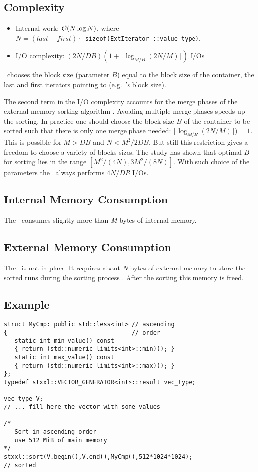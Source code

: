 \documentclass[twoside]{book}
\begin{document}
\subsection*{Complexity}
\label{sortcomplexity}
\begin{itemize}
\item Internal work: $\mathcal{O}\!\left( N \log N\right)$, where \\$N = (last -
first)\cdot$~\texttt{sizeof(ExtIterator\_::value\_type)}.
\item I/O complexity: $(2N/DB)(1 + \lceil {\log}_{M/B}(2N/M) \rceil)$ I/Os
\end{itemize}

\xsort\ chooses the block size (parameter $B$) equal to the block size
of the container, the last and first iterators pointing to
(e.g.\ \xvector's block size).

The second term in the I/O complexity accounts for the merge phases of
the external memory sorting algorithm \cite{DemSan03}. Avoiding
multiple merge phases  
speeds up the sorting. In practice one should choose the block size
$B$ of the container to be 
sorted such that there is only one merge phase needed: $\lceil
{\log}_{M/B}(2N/M) \rceil) = 1$. This is 
possible for $M > DB$ and $N < M^2/2DB$. But still this restriction
gives a freedom to choose a variety of blocks sizes. The study
\cite{DemSan03} has shown that optimal $B$ for sorting lies in the
range $[M^2/(4N),3M^2/(8N)]$. With such choice of the parameters the
\xsort\ always performs $4N/DB$ I/Os.

\subsection*{Internal Memory Consumption}
\label{sortimem}
The \xsort\ consumes slightly more than \emph{M} bytes of internal
memory. 

\subsection*{External Memory Consumption}
\label{sortemem}
The \xsort\ is not in-place. It requires about $N$ bytes of external
memory to store the sorted runs during the sorting process
\cite{DemSan03}. After the sorting this memory is freed.

\subsection*{Example}
\begin{lstlisting}
struct MyCmp: public std::less<int> // ascending
{                                   // order
   static int min_value() const  
   { return (std::numeric_limits<int>::min)(); }
   static int max_value() const  
   { return (std::numeric_limits<int>::max)(); }
};
typedef stxxl::VECTOR_GENERATOR<int>::result vec_type;

vec_type V;
// ... fill here the vector with some values

/*
   Sort in ascending order
   use 512 MiB of main memory
*/
stxxl::sort(V.begin(),V.end(),MyCmp(),512*1024*1024);
// sorted
\end{lstlisting}
\end{document}
